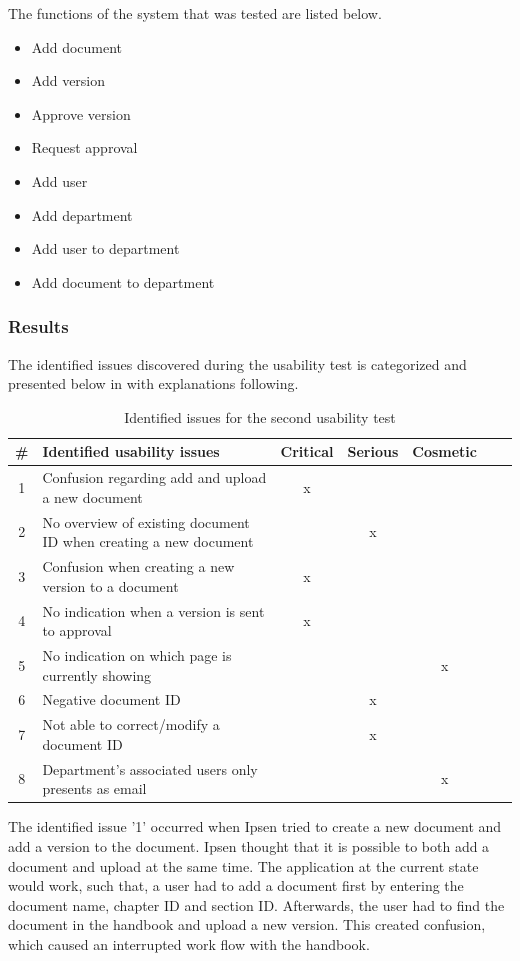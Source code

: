 \documentclass[../../master.tex]{subfiles}
\begin{document}
The functions of the system that was tested are listed below.

\begin{itemize}
	\item Add document
	\item Add version
	\item Approve version
	\item Request approval
	\item Add user
	\item Add department
	\item Add user to department
	\item Add document to department
\end{itemize}

\subsubsection*{Results}
The identified issues discovered during the usability test is categorized and presented below in  with explanations following.

\begin{table}[H]
	\begin{center}
	\begin{tabular}{| c | m{21em} | c | c | c | c | c |}
		\hline
		\# & \textbf{Identified usability issues} & Critical  & Serious & Cosmetic \\
		\hline
		 1 & Confusion regarding add and upload a new document   & x &  &  \\
		\hline
		 2 & No overview of existing document ID when creating a new document &  & x & \\
		\hline
		 3 & Confusion when creating a new version to a document & x & &  \\
		\hline
		4 & No indication when a version is sent to approval & x & & \\
		\hline
		5 & No indication on which page is currently showing &  &  & x \\
		\hline
		6 & Negative document ID &  & x & \\
		\hline
		7 & Not able to correct/modify a document ID & & x &  \\
		\hline
		8 & Department's associated users only presents as email &  &  & x \\
		\hline
	\end{tabular}
	\end{center}
	\caption{Identified issues for the second usability test}\label{tab:utest2}
\end{table}
The identified issue '1' occurred when Ipsen tried to create a new document and add a version to the document.
Ipsen thought that it is possible to both add a document and upload at the same time.
The application at the current state would work, such that, a user had to add a document first by entering the document name, chapter ID and section ID.
Afterwards, the user had to find the document in the handbook and upload a new version.
This created confusion, which caused an interrupted work flow with the handbook.
\end{document}
